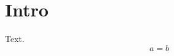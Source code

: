\documentclass{mysmf}
\begin{document}
\section{Intro}
Text.
\begin{equation}a=b\end{equation}
\end{document}
